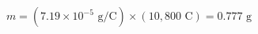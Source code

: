 \documentclass[preview]{standalone}
\begin{document}
\[m = (7.19 \times 10^{-5} \text{ g/C}) \times (10{,}800 \text{ C}) = 0.777 \text{ g}\]
\end{document}
